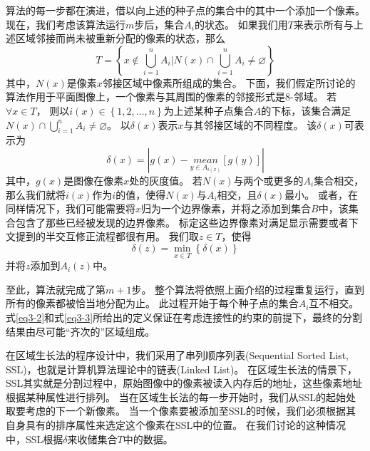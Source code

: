 算法的每一步都在演进，借以向上述的种子点的集合中的其中一个添加一个像素。
现在，我们考虑该算法运行$m$步后，集合$A_i$的状态。
如果我们用$T$来表示所有与上述区域邻接而尚未被重新分配的像素的状态，那么
\begin{equation}
\label{eq3-1}
T = \left\{x\notin\bigcup_{i=1}^{n}A_i|N(x)\cap\bigcup_{i=1}^{n}A_i\neq\varnothing\right\}
\end{equation}
其中，$N(x)$是像素$x$邻接区域中像素所组成的集合。
下面，我们假定所讨论的算法作用于平面图像上，一个像素与其周围的像素的邻接形式是$8$-邻域。
若$\forall x\in T$，
则以$i(x)\in \left\{1, 2, \ldots, n\right\}$为上述某种子点集合$A$的下标，该集合满足$N(x)\cap\bigcup_{i=1}^{n}A_i\neq\varnothing$。
以$\delta(x)$表示$x$与其邻接区域的不同程度。
该$\delta(x)$可表示为
\begin{equation}
\label{eq3-2}
\delta(x)=\left|g(x)-\underset{y\in A_{i(x)}}{mean}[g(y)]\right|
\end{equation}
其中，$g(x)$是图像在像素$x$处的灰度值。
若$N(x)$与两个或更多的$A_i$集合相交，那么我们就将$i(x)$作为$i$的值，使得$N(x)$与$A_i$相交，且$\delta(x)$最小。
或者，在同样情况下，我们可能需要将$x$归为一个边界像素，并将之添加到集合$B$中，该集合包含了那些已经被发现的边界像素。
标定这些边界像素对满足显示需要或者下文提到的半交互修正流程都很有用。
我们取$z\in T$，使得
\begin{equation}
\label{eq3-3}
\delta(z)=\min\limits_{x\in T}{\left\{\delta(x)\right\}}
\end{equation}
并将$z$添加到$A_i(z)$中。

至此，算法就完成了第$m+1$步。
整个算法将依照上面介绍的过程重复运行，直到所有的像素都被恰当地分配为止。
此过程开始于每个种子点的集合$A_i$互不相交。
式\ref{eq3-2}和式\ref{eq3-3}所给出的定义保证在考虑连接性的约束的前提下，最终的分割结果由尽可能“齐次的”区域组成。

在区域生长法的程序设计中，我们采用了串列顺序列表(Sequential Sorted List, SSL)，也就是计算机算法理论中的链表(Linked List)。
在区域生长法的情景下，SSL其实就是分割过程中，原始图像中的像素被读入内存后的地址，这些像素地址根据某种属性进行排列。
当在区域生长法的每一步开始时，我们从SSL的起始处取要考虑的下一个新像素。
当一个像素要被添加至SSL的时候，我们必须根据其自身具有的排序属性来选定这个像素在SSL中的位置。
在我们讨论的这种情况中，SSL根据$\delta$来收储集合$T$中的数据。

